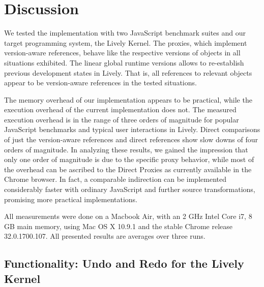 \chapter{Discussion} \label{sec:DISCUSSION}

We tested the implementation with two JavaScript benchmark suites and our target programming system, the Lively Kernel.
The proxies, which implement version-aware references, behave like the respective versions of objects in all situations exhibited.
The linear global runtime versions allows to re-establish previous development states in Lively.
That is, all references to relevant objects appear to be version-aware references in the tested situations.

The memory overhead of our implementation appears to be practical, while the execution overhead of the current implementation does not.
The measured execution overhead is in the range of three orders of magnitude for popular JavaScript benchmarks and typical user interactions in Lively.
Direct comparisons of just the version-aware references and direct references show slow downs of four orders of magnitude.
In analyzing these results, we gained the impression that only one order of magnitude is due to the specific proxy behavior, while most of the overhead can be ascribed to the Direct Proxies as currently available in the Chrome browser.
In fact, a comparable indirection can be implemented considerably faster with ordinary JavaScript and further source transformations, promising more practical implementations.

All measurements were done on a Macbook Air, with an 2 GHz Intel Core i7, 8 GB main memory, using Mac OS X 10.9.1 and the stable Chrome release 32.0.1700.107.
All presented results are averages over three runs.

\section{Functionality: Undo and Redo for the Lively Kernel}

